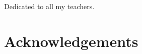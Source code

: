 \cleardoublepage
\pagestyle{empty}
\begin{center}
  \vspace*{0.3\paperheight}
  Dedicated to all my teachers.
\end{center}
\pagestyle{fancy}

\chapter*{Acknowledgements}

\blindtext
